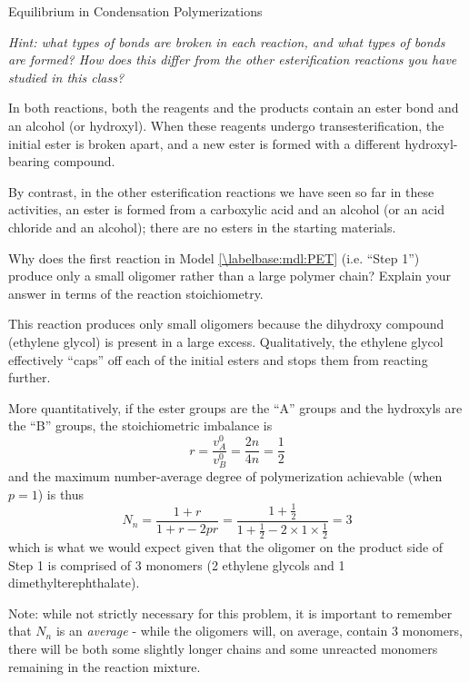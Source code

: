 \begin{activity}{Equilibrium in Condensation Polymerizations}
\begin{exercises}
			\emph{Hint: what types of bonds are broken in each reaction, and what types of bonds are formed?  How does this differ from the other esterification reactions you have studied in this class?}
			
			\begin{solution}{}
				In both reactions, both the reagents and the products contain an ester bond and an alcohol (or hydroxyl).  When these reagents undergo transesterification, the initial ester is broken apart, and a new ester is formed with a different hydroxyl-bearing compound.
				
				By contrast, in the other esterification reactions we have seen so far in these activities, an ester is formed from a carboxylic acid and an alcohol (or an acid chloride and an alcohol); there are no esters in the starting materials.
				
			\end{solution}
		
		\exercise Why does the first reaction in Model \ref{\labelbase:mdl:PET} (i.e. ``Step 1'') produce only a small oligomer rather than a large polymer chain?  Explain your answer in terms of the reaction stoichiometry.
		
			\begin{solution}{}
				This reaction produces only small oligomers because the dihydroxy compound (ethylene glycol) is present in a large excess.  Qualitatively, the ethylene glycol effectively ``caps'' off each of the initial esters and stops them from reacting further.
				
				More quantitatively, if the ester groups are the ``A'' groups and the hydroxyls are the ``B'' groups, the stoichiometric imbalance is
				\begin{equation*}
					r=  \frac{v_A^0}{v_B^0} = \frac{2n}{4n} = \frac{1}{2}
				\end{equation*}
				and the maximum number-average degree of polymerization achievable (when $p=1$) is thus
				\begin{equation*}
					N_n = \frac{1+r}{1+r-2pr} = \frac{1 + \frac{1}{2}}{1 + \frac{1}{2} - 2\times1\times\frac{1}{2}} = 3
				\end{equation*}
				which is what we would expect given that the oligomer on the product side of Step 1 is comprised of 3 monomers (2 ethylene glycols and 1 dimethylterephthalate).
				
				Note: while not strictly necessary for this problem, it is important to remember that $N_n$ is an \emph{average} - while the oligomers will, on average, contain 3 monomers, there will be both some slightly longer chains and some unreacted monomers remaining in the reaction mixture.
				

\end{solution}
\end{exercises}
\end{activity}
